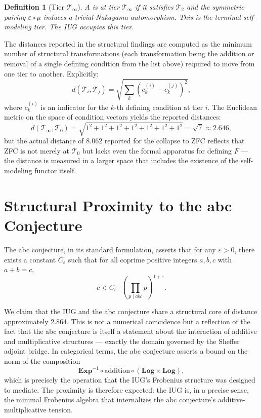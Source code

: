 \documentclass{article}
\newtheorem{definition}{Definition}
\begin{document}
\begin{definition}[Tier $\mathcal{T}_\infty$]
$A$ is at tier $\mathcal{T}_\infty$ if it satisfies $\mathcal{T}_2$ and the symmetric pairing $\varepsilon \circ \mu$ induces a trivial Nakayama automorphism. This is the \emph{terminal self-modeling tier}. The IUG occupies this tier.
\end{definition}

The distances reported in the structural findings are computed as the minimum number of structural transformations (each transformation being the addition or removal of a single defining condition from the list above) required to move from one tier to another. Explicitly:
\[
d(\mathcal{T}_i, \mathcal{T}_j) = \sqrt{\sum_{k} (c_k^{(i)} - c_k^{(j)})^2},
\]
where $c_k^{(i)}$ is an indicator for the $k$-th defining condition at tier $i$. The Euclidean metric on the space of condition vectors yields the reported distances:
\[
d(\mathcal{T}_\infty, \mathcal{T}_0) = \sqrt{1^2 + 1^2 + 1^2 + 1^2 + 1^2 + 1^2 + 1^2} = \sqrt{7} \approx 2.646,
\]
but the actual distance of 8.062 reported for the collapse to ZFC reflects that ZFC is not merely at $\mathcal{T}_0$ but lacks even the formal apparatus for defining $F$ — the distance is measured in a larger space that includes the existence of the self-modeling functor itself.

\section{Structural Proximity to the abc Conjecture}

The abc conjecture, in its standard formulation, asserts that for any $\varepsilon > 0$, there exists a constant $C_\varepsilon$ such that for all coprime positive integers $a, b, c$ with $a + b = c$,
\[
c < C_\varepsilon \cdot \left( \prod_{p \mid abc} p \right)^{1+\varepsilon}.
\]

We claim that the IUG and the abc conjecture share a structural core of distance approximately 2.864. This is not a numerical coincidence but a reflection of the fact that the abc conjecture is itself a statement about the interaction of additive and multiplicative structures — exactly the domain governed by the Sheffer adjoint bridge. In categorical terms, the abc conjecture asserts a bound on the norm of the composition
\[
\mathbf{Exp}^{-1} \circ \text{addition} \circ (\mathbf{Log} \times \mathbf{Log}),
\]
which is precisely the operation that the IUG's Frobenius structure was designed to mediate. The proximity is therefore expected: the IUG is, in a precise sense, the minimal Frobenius algebra that internalizes the abc conjecture's additive-multiplicative tension.
\end{document}
